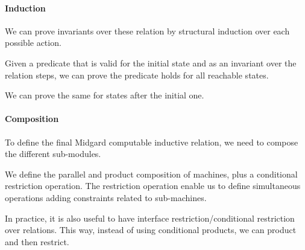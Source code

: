 \paragraph{Induction}
%
We can prove invariants over these relation by structural induction over each
possible action.

\begin{definition}
  \leanok
  \label{dfn:Relations.StepMachines.ApplyInd}
  Given a predicate that is valid for the initial state and as an invariant over
the relation steps, we can prove the predicate holds for all reachable states.
  \end{definition}

We can prove the same for states after the initial one.

\begin{definition}
  \leanok
  \label{dfn:Relations.StepMachines.ApplyFromInit}
  \end{definition}


\paragraph{Composition}

To define the final Midgard computable inductive relation, we need to compose
the different sub-modules.

We define the parallel and product composition of machines, plus a conditional
restriction operation.
%
The restriction operation enable us to define simultaneous operations adding
constraints related to sub-machines.

\begin{definition}
  \leanok
  \label{dfn:Relations.Products.Joint}
  \end{definition}

\begin{definition}
  \leanok
  \label{dfn:Relations.Products.Conditional_Joint}
  \end{definition}

In practice, it is also useful to have interface restriction/conditional
restriction over relations.
%
This way, instead of using conditional products, we can product and then restrict.

\begin{definition}
  \leanok
  \label{dfn:Relations.InterfaceRestrictions.ConditionalSub}
  \end{definition}

